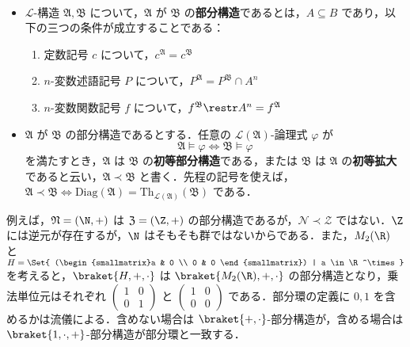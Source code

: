 \documentclass[a4j,xelatex,ja=standard]{ltjsarticle}
\newcommand{\Diag}{\mathrm{Diag}}
\newcommand{\Th}{\mathrm{Th}}
\begin{document}
\begin{definition}
 　
 
 \begin{itemize}
  \item $\mathcal{L}$-構造 $\mathfrak{A}, \mathfrak{B}$ について，$\mathfrak{A}$ が $\mathfrak{B}$ の{\bfseries 部分構造}であるとは，$A \subseteq B$ であり，以下の三つの条件が成立することである：
	\begin{enumerate}
	 \item 定数記号 $c$ について，$c^\mathfrak{A} = c^\mathfrak{B}$
	 \item $n$-変数述語記号 $P$ について，$P^\mathfrak{A} = P^\mathfrak{B} \cap A^n$
	 \item $n$-変数関数記号 $f$ について，$f^\mathfrak{B} \restr A^n = f^\mathfrak{A}$
	\end{enumerate}
  \item $\mathfrak{A}$ が $\mathfrak{B}$ の部分構造であるとする．任意の $\mathcal{L}(\mathfrak{A})$-論理式 $\varphi$ が
	\[
	 \mathfrak{A} \models \varphi \Longleftrightarrow \mathfrak{B} \models \varphi
	\]
	を満たすとき，$\mathfrak{A}$ は $\mathfrak{B}$ の{\bfseries 初等部分構造}である，または $\mathfrak{B}$ は $\mathfrak{A}$ の{\bfseries 初等拡大}であると云い，$\mathfrak{A} \prec \mathfrak{B}$ と書く．先程の記号を使えば，$\mathfrak{A} \prec \mathfrak{B} \Leftrightarrow \Diag(\mathfrak{A}) = \Th_{\mathcal{L}(\mathfrak{A})}(\mathfrak{B})$ である．
 \end{itemize}
\end{definition}

例えば，$\mathfrak{N} = (\N, +)$ は $\mathfrak{Z} = (\Z, +)$ の部分構造であるが，$\mathcal{N} \prec \mathcal{Z}$ ではない．$\Z$ には逆元が存在するが，$\N$ はそもそも群ではないからである．また，$M_2(\R)$ と $H = \Set{ (\begin{smallmatrix}a & 0 \\ 0 & 0 \end{smallmatrix}) | a \in \R^\times}$ を考えると，$\braket{H, +, \cdot}$ は $\braket{M_2(\R), +, \cdot}$ の部分構造となり，乗法単位元はそれぞれ $(\begin{smallmatrix}1&0 \\ 0&1\end{smallmatrix})$ と $(\begin{smallmatrix}1&0 \\ 0&0\end{smallmatrix})$ である．部分環の定義に $0, 1$ を含めるかは流儀による．含めない場合は $\braket{+, \cdot}$-部分構造が，含める場合は $\braket{1, \cdot, +}$-部分構造が部分環と一致する．
\end{document}
